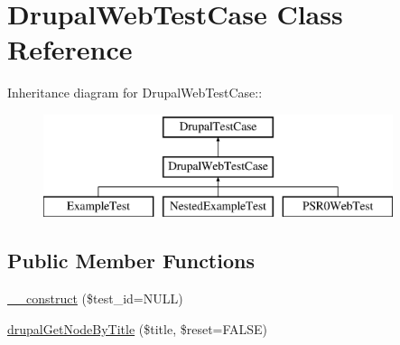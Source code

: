 \hypertarget{classDrupalWebTestCase}{
\section{DrupalWebTestCase Class Reference}
\label{classDrupalWebTestCase}
}
Inheritance diagram for DrupalWebTestCase::\begin{figure}[H]
\begin{center}
\leavevmode
\includegraphics[height=3cm]{classDrupalWebTestCase}
\end{center}
\end{figure}
\subsection*{Public Member Functions}
\begin{DoxyCompactItemize}
\item 
\hyperlink{classDrupalWebTestCase_a76d165c12dc6042bae017b5c521e6ffa}{\_\-\_\-construct} (\$test\_\-id=NULL)
\item 
\hyperlink{classDrupalWebTestCase_aa725a4afdef576800747172fdf445735}{drupalGetNodeByTitle} (\$title, \$reset=FALSE)
\end{DoxyCompactItemize}
